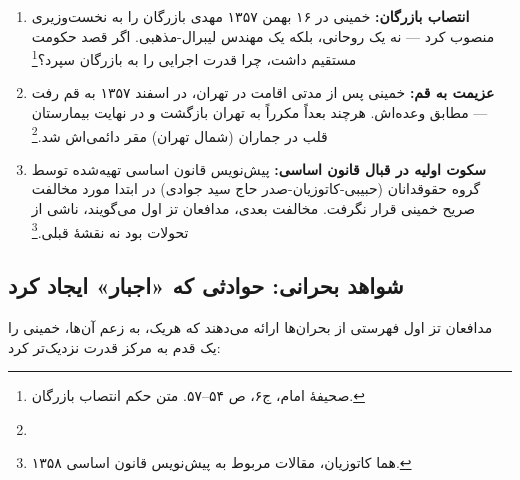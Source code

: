 \documentclass[12pt,a4paper]{book}
\newcommand{\en}[1]{\lr{\textit{#1}}}
\begin{document}
\begin{enumerate}[label=\textcolor{cGreen}{\bfseries شاهد \arabic*:}, rightmargin=2em]
    \item \textbf{انتصاب بازرگان:} خمینی در ۱۶ بهمن ۱۳۵۷ مهدی بازرگان را به نخست‌وزیری منصوب کرد — نه یک روحانی، بلکه یک مهندس لیبرال-مذهبی. اگر قصد حکومت مستقیم داشت، چرا قدرت اجرایی را به بازرگان سپرد؟\footnote{صحیفهٔ امام، ج۶، ص ۵۴–۵۷. متن حکم انتصاب بازرگان.}

    \item \textbf{عزیمت به قم:} خمینی پس از مدتی اقامت در تهران، در اسفند ۱۳۵۷ به قم رفت — مطابق وعده‌اش. هرچند بعداً مکرراً به تهران بازگشت و در نهایت بیمارستان قلب در جماران (شمال تهران) مقر دائمی‌اش شد.\footnote{\en{Moin (1999), pp.\,210--212.}}

    \item \textbf{سکوت اولیه در قبال قانون اساسی:} پیش‌نویس قانون اساسی تهیه‌شده توسط گروه حقوقدانان (حبیبی-کاتوزیان-صدر حاج سید جوادی) در ابتدا مورد مخالفت صریح خمینی قرار نگرفت. مخالفت بعدی، مدافعان تز اول می‌گویند، ناشی از تحولات بود نه نقشهٔ قبلی.\footnote{هما کاتوزیان، مقالات مربوط به پیش‌نویس قانون اساسی ۱۳۵۸.}
\end{enumerate}

\subsection{شواهد بحرانی: حوادثی که «اجبار» ایجاد کرد}

مدافعان تز اول فهرستی از بحران‌ها ارائه می‌دهند که هر‌یک، به زعم آن‌ها، خمینی را یک قدم به مرکز قدرت نزدیک‌تر کرد:
\end{document}
